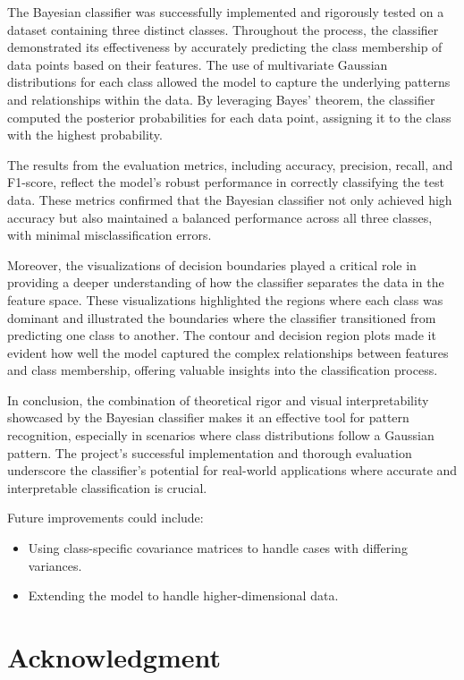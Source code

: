 \documentclass[conference]{IEEEtran}
\begin{document}
The Bayesian classifier was successfully implemented and rigorously tested on a dataset containing three distinct classes. Throughout the process, the classifier demonstrated its effectiveness by accurately predicting the class membership of data points based on their features. The use of multivariate Gaussian distributions for each class allowed the model to capture the underlying patterns and relationships within the data. By leveraging Bayes' theorem, the classifier computed the posterior probabilities for each data point, assigning it to the class with the highest probability.

The results from the evaluation metrics, including accuracy, precision, recall, and F1-score, reflect the model's robust performance in correctly classifying the test data. These metrics confirmed that the Bayesian classifier not only achieved high accuracy but also maintained a balanced performance across all three classes, with minimal misclassification errors.

Moreover, the visualizations of decision boundaries played a critical role in providing a deeper understanding of how the classifier separates the data in the feature space. These visualizations highlighted the regions where each class was dominant and illustrated the boundaries where the classifier transitioned from predicting one class to another. The contour and decision region plots made it evident how well the model captured the complex relationships between features and class membership, offering valuable insights into the classification process.

In conclusion, the combination of theoretical rigor and visual interpretability showcased by the Bayesian classifier makes it an effective tool for pattern recognition, especially in scenarios where class distributions follow a Gaussian pattern. The project's successful implementation and thorough evaluation underscore the classifier’s potential for real-world applications where accurate and interpretable classification is crucial.

Future improvements could include:
\begin{itemize}
	\item Using class-specific covariance matrices to handle cases with differing variances.
	\item Extending the model to handle higher-dimensional data.
\end{itemize}

\section*{Acknowledgment}
\end{document}
